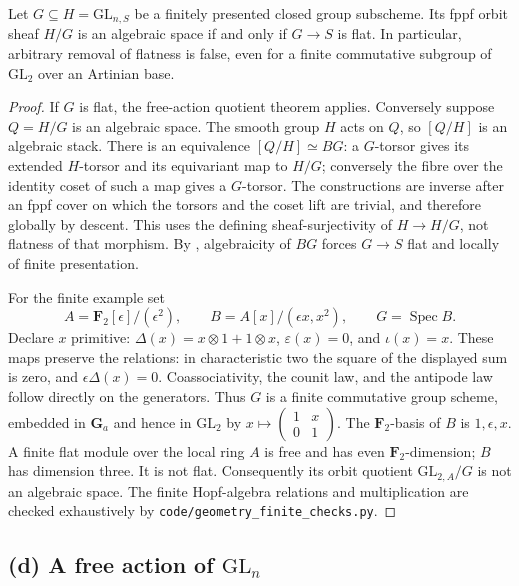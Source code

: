 \begin{theorem}
\label{geo-Kc}
Let $G\subseteq H=\mathrm{GL}_{n,S}$ be a finitely presented closed group
subscheme. Its fppf orbit sheaf $H/G$ is an algebraic space if and only if
$G\to S$ is flat.
In particular, arbitrary removal of flatness is false, even for a finite
commutative subgroup of $\mathrm{GL}_2$ over an Artinian base.
\end{theorem}
\begin{proof}
If $G$ is flat, the free-action quotient theorem
\cite[Lemma 80.11.7, tag 06PH]{geoStacksFreeQuotient} applies.
Conversely suppose $Q=H/G$ is an algebraic space. The smooth group $H$
acts on $Q$, so $[Q/H]$ is an algebraic stack. There is an equivalence
$[Q/H]\simeq BG$: a $G$-torsor gives its extended $H$-torsor and its
equivariant map to $H/G$; conversely the fibre over the identity coset of
such a map gives a $G$-torsor. The constructions are inverse after an fppf
cover on which the torsors and the coset lift are trivial, and therefore
globally by descent. This uses the defining sheaf-surjectivity of
$H\to H/G$, not flatness of that morphism. By
\cite[Lemma 97.18.3, tag 06PL]{geoStacksBG}, algebraicity of $BG$ forces
$G\to S$ flat and locally of finite presentation.

For the finite example set
\[
 A=\mathbf F_2[\epsilon]/(\epsilon^2),\qquad
 B=A[x]/(\epsilon x,x^2),\qquad G=\operatorname{Spec}B.
\]
Declare $x$ primitive: $\Delta(x)=x\otimes1+1\otimes x$,
$\varepsilon(x)=0$, and $\iota(x)=x$. These maps preserve the relations:
in characteristic two the square of the displayed sum is zero, and
$\epsilon\Delta(x)=0$. Coassociativity, the counit law, and the antipode
law follow directly on the generators. Thus $G$ is a finite commutative
group scheme, embedded in $\mathbf G_a$ and hence in $\mathrm{GL}_2$ by
$x\mapsto\left(\begin{smallmatrix}1&x\\0&1\end{smallmatrix}\right)$.
The $\mathbf F_2$-basis of $B$ is $1,\epsilon,x$. A finite flat module
over the local ring $A$ is free and has even $\mathbf F_2$-dimension;
$B$ has dimension three. It is not flat. Consequently its orbit quotient
$\mathrm{GL}_{2,A}/G$ is not an algebraic space. The finite Hopf-algebra
relations and multiplication are checked exhaustively by
\texttt{code/geometry\_finite\_checks.py}.
\end{proof}

\subsection{(d) A free action of \texorpdfstring{$\mathrm{GL}_n$}{GL(n)}}

